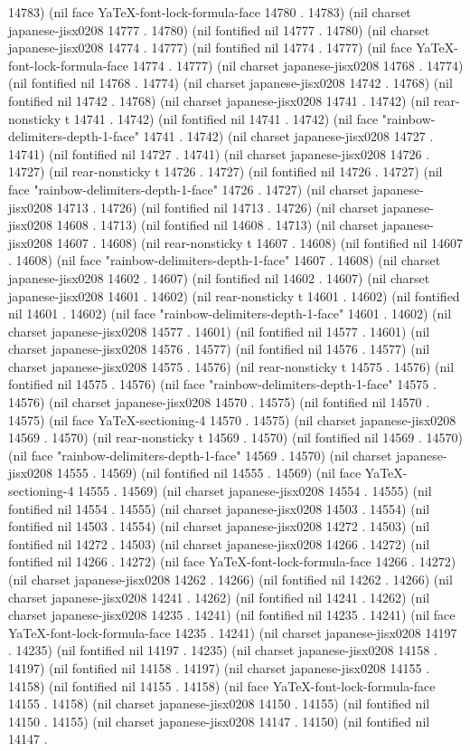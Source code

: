14783) (nil face YaTeX-font-lock-formula-face 14780 . 14783) (nil charset japanese-jisx0208 14777 . 14780) (nil fontified nil 14777 . 14780) (nil charset japanese-jisx0208 14774 . 14777) (nil fontified nil 14774 . 14777) (nil face YaTeX-font-lock-formula-face 14774 . 14777) (nil charset japanese-jisx0208 14768 . 14774) (nil fontified nil 14768 . 14774) (nil charset japanese-jisx0208 14742 . 14768) (nil fontified nil 14742 . 14768) (nil charset japanese-jisx0208 14741 . 14742) (nil rear-nonsticky t 14741 . 14742) (nil fontified nil 14741 . 14742) (nil face "rainbow-delimiters-depth-1-face" 14741 . 14742) (nil charset japanese-jisx0208 14727 . 14741) (nil fontified nil 14727 . 14741) (nil charset japanese-jisx0208 14726 . 14727) (nil rear-nonsticky t 14726 . 14727) (nil fontified nil 14726 . 14727) (nil face "rainbow-delimiters-depth-1-face" 14726 . 14727) (nil charset japanese-jisx0208 14713 . 14726) (nil fontified nil 14713 . 14726) (nil charset japanese-jisx0208 14608 . 14713) (nil fontified nil 14608 . 14713) (nil charset japanese-jisx0208 14607 . 14608) (nil rear-nonsticky t 14607 . 14608) (nil fontified nil 14607 . 14608) (nil face "rainbow-delimiters-depth-1-face" 14607 . 14608) (nil charset japanese-jisx0208 14602 . 14607) (nil fontified nil 14602 . 14607) (nil charset japanese-jisx0208 14601 . 14602) (nil rear-nonsticky t 14601 . 14602) (nil fontified nil 14601 . 14602) (nil face "rainbow-delimiters-depth-1-face" 14601 . 14602) (nil charset japanese-jisx0208 14577 . 14601) (nil fontified nil 14577 . 14601) (nil charset japanese-jisx0208 14576 . 14577) (nil fontified nil 14576 . 14577) (nil charset japanese-jisx0208 14575 . 14576) (nil rear-nonsticky t 14575 . 14576) (nil fontified nil 14575 . 14576) (nil face "rainbow-delimiters-depth-1-face" 14575 . 14576) (nil charset japanese-jisx0208 14570 . 14575) (nil fontified nil 14570 . 14575) (nil face YaTeX-sectioning-4 14570 . 14575) (nil charset japanese-jisx0208 14569 . 14570) (nil rear-nonsticky t 14569 . 14570) (nil fontified nil 14569 . 14570) (nil face "rainbow-delimiters-depth-1-face" 14569 . 14570) (nil charset japanese-jisx0208 14555 . 14569) (nil fontified nil 14555 . 14569) (nil face YaTeX-sectioning-4 14555 . 14569) (nil charset japanese-jisx0208 14554 . 14555) (nil fontified nil 14554 . 14555) (nil charset japanese-jisx0208 14503 . 14554) (nil fontified nil 14503 . 14554) (nil charset japanese-jisx0208 14272 . 14503) (nil fontified nil 14272 . 14503) (nil charset japanese-jisx0208 14266 . 14272) (nil fontified nil 14266 . 14272) (nil face YaTeX-font-lock-formula-face 14266 . 14272) (nil charset japanese-jisx0208 14262 . 14266) (nil fontified nil 14262 . 14266) (nil charset japanese-jisx0208 14241 . 14262) (nil fontified nil 14241 . 14262) (nil charset japanese-jisx0208 14235 . 14241) (nil fontified nil 14235 . 14241) (nil face YaTeX-font-lock-formula-face 14235 . 14241) (nil charset japanese-jisx0208 14197 . 14235) (nil fontified nil 14197 . 14235) (nil charset japanese-jisx0208 14158 . 14197) (nil fontified nil 14158 . 14197) (nil charset japanese-jisx0208 14155 . 14158) (nil fontified nil 14155 . 14158) (nil face YaTeX-font-lock-formula-face 14155 . 14158) (nil charset japanese-jisx0208 14150 . 14155) (nil fontified nil 14150 . 14155) (nil charset japanese-jisx0208 14147 . 14150) (nil fontified nil 14147 . 